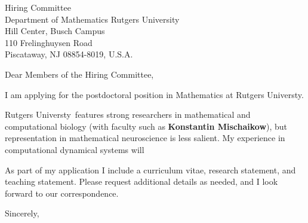 \documentclass[11pt,a4paper]{letter}
\begin{document}
\def\School{Rutgers Universty}
\begin{letter}
{Hiring Committee\\
Department of Mathematics Rutgers University\\
Hill Center, Busch Campus\\
110 Frelinghuysen Road\\
Piscataway, NJ 08854-8019, U.S.A.}


\opening{Dear Members of the Hiring Committee,}

I am applying for the postdoctoral position in Mathematics at \School. 



\School~features strong researchers in mathematical and computational biology (with faculty such as \textbf{Konstantin Mischaikow}), but representation in mathematical neuroscience is less salient. My experience in computational dynamical systems will 



As part of my application I include a curriculum vitae, research statement, and teaching statement. Please request additional details as needed, and I look forward to our correspondence.

\closing{Sincerely,}
\end{letter}
\end{document}
